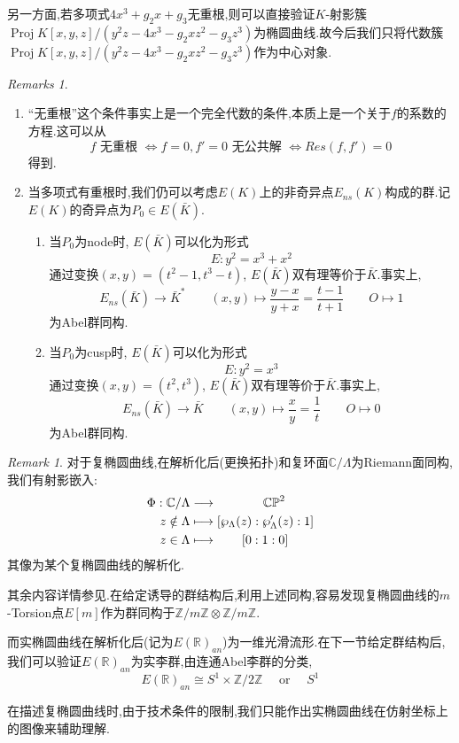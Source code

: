\documentclass[12pt,A4paper,oneside,reqno]{amsart}
\numberwithin{equation}{section}
\theoremstyle{definition}
\theoremstyle{plain}
\theoremstyle{plain}
\numberwithin{equation}{section}
\theoremstyle{remark}
\newtheorem{remark}[theorem]{Remark}
\newtheorem{remarks}[theorem]{Remarks}
\DeclareMathOperator{\Proj}{\operatorname{Proj}}
\begin{document}
另一方面,若多项式$4x^3+g_2x+g_3$无重根,则可以直接验证$K$-射影簇$\Proj K[x,y,z]/(y^2z-4x^3-g_2xz^2-g_3z^3)$为椭圆曲线.故今后我们只将代数簇$\Proj K[x,y,z]/(y^2z-4x^3-g_2xz^2-g_3z^3)$作为中心对象.
\begin{remarks}\
	\begin{enumerate}
		\item “无重根”这个条件事实上是一个完全代数的条件,本质上是一个关于$f$的系数的方程.这可以从
		$$f\text{ 无重根 } \Leftrightarrow f=0,f'=0 \text{ 无公共解 }\Leftrightarrow Res(f,f')=0$$
		得到.
		\item 当多项式有重根时,我们仍可以考虑$E(K)$上的非奇异点$E_{ns}(K)$构成的群.记$E(K)$的奇异点为$P_0 \in E(\bar{K})$.
		\begin{enumerate}
			\item 当$P_0$为node时, $E(\bar{K})$可以化为形式$$E:y^2=x^3+x^2$$
			通过变换$(x,y)=(t^2-1,t^3-t)$, $E(\bar{K})$双有理等价于$\bar{K}$.事实上,
			$$E_{ns}(\bar{K}) \longrightarrow \bar{K}^{*} \qquad (x,y) \longmapsto \frac{y-x}{y+x}=\frac{t-1}{t+1} \qquad O \longmapsto 1$$
			为Abel群同构.
			\item 当$P_0$为cusp时, $E(\bar{K})$可以化为形式$$E:y^2=x^3$$
			通过变换$(x,y)=(t^2,t^3)$, $E(\bar{K})$双有理等价于$\bar{K}$.事实上,
			$$E_{ns}(\bar{K}) \longrightarrow \bar{K} \qquad (x,y) \longmapsto \frac{x}{y}=\frac{1}{t} \qquad O \longmapsto 0$$
			为Abel群同构.			
		\end{enumerate}
	\end{enumerate}
	
\end{remarks}
\begin{remark}
	对于复椭圆曲线,在解析化后(更换拓扑)和复环面$\mathbb{C}/\Lambda$为Riemann面同构,我们有射影嵌入:
	\begin{equation}\label{eq:proembed}
	\begin{aligned}
	\Phi: \mathbb{C}/\Lambda &\longrightarrow \hspace{1.3cm}\mathbb{CP}^2\\
	z \notin \Lambda &\longmapsto [\wp_{\Lambda}(z):\wp'_{\Lambda}(z):1]\\
	z \in \Lambda &\longmapsto\hspace{0.7cm} [0:1:0]\\
	\end{aligned}
	\end{equation}
	其像为某个复椭圆曲线的解析化.
	
	其余内容详情参见\cite[第二,八章]{Li2019modularform}.在给定诱导的群结构后,利用上述同构,容易发现复椭圆曲线的$m$-Torsion点$E[m]$作为群同构于$\mathbb{Z}/m\mathbb{Z} \otimes \mathbb{Z}/m\mathbb{Z}$.
	
	而实椭圆曲线在解析化后(记为$E(\mathbb{R})_{an}$)为一维光滑流形.在下一节给定群结构后,我们可以验证$E(\mathbb{R})_{an}$为实李群,由连通Abel李群的分类,
	$$E(\mathbb{R})_{an} \cong S^1 \times \mathbb{Z}/2\mathbb{Z} \quad\text{ or }\quad S^1$$
	
	在描述复椭圆曲线时,由于技术条件的限制,我们只能作出实椭圆曲线在仿射坐标上的图像来辅助理解.
\end{remark}
\end{document}
